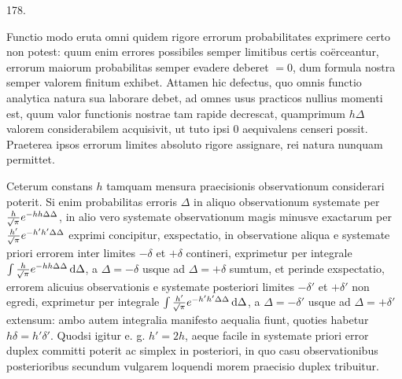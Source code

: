 \begin{center}\hypertarget{native-250-article178}{}178.\end{center}
Functio modo eruta omni quidem rigore errorum probabilitates exprimere
certo non potest: quum enim errores possibiles semper limitibus certis
coërceantur, errorum maiorum probabilitas semper evadere deberet $=0$, dum
formula nostra semper valorem finitum exhibet. Attamen hic defectus, quo omnis
functio analytica natura sua laborare debet, ad omnes usus practicos nullius
momenti est, quum valor functionis nostrae tam rapide decrescat, quamprimum
$h\Delta$ valorem considerabilem acquisivit, ut tuto ipsi $0$ aequivalens censeri
possit. Praeterea ipsos errorum limites absoluto rigore assignare, rei natura
nunquam permittet.

Ceterum constans $h$ tamquam mensura praecisionis observationum considerari
poterit. Si enim probabilitas erroris $\Delta$ in aliquo observationum systemate
per $\frac{h}{\mathord{{}^{}\!\surd}\pi}e^{-hh\Delta\Delta}$, in alio vero systemate
observationum magis minusve exactarum per
$\frac{h'}{\mathord{{}^{}\!\surd}\pi}e^{-h'h'\Delta\Delta}$ exprimi concipitur,
exspectatio, in observatione aliqua e systemate priori errorem inter limites
$-\delta$ et $+\delta$ contineri, exprimetur per integrale
$\int\frac{h}{\mathord{{}^{}\!\surd}\pi}e^{-hh\Delta\Delta}\,\mathrm{d}\Delta$,
a $\Delta=-\delta$ usque ad $\Delta=+\delta$ sumtum, et perinde exspectatio,
errorem alicuius observationis e systemate posteriori limites $-\delta'$ et
$+\delta'$ non egredi, exprimetur per integrale
$\int\frac{h'}{\mathord{{}^{}\!\surd}\pi}e^{-h'h'\Delta\Delta}\,\mathrm{d}\Delta$,
a $\Delta=-\delta'$ usque ad $\Delta=+\delta'$ extensum: ambo autem integralia
manifesto aequalia fiunt, quoties habetur $h\delta=h'\delta'$. Quodsi igitur
e. g. $h'=2h$, aeque facile in systemate priori error duplex committi poterit
ac simplex in posteriori, in quo casu observationibus posterioribus secundum
vulgarem loquendi morem praecisio duplex tribuitur.
